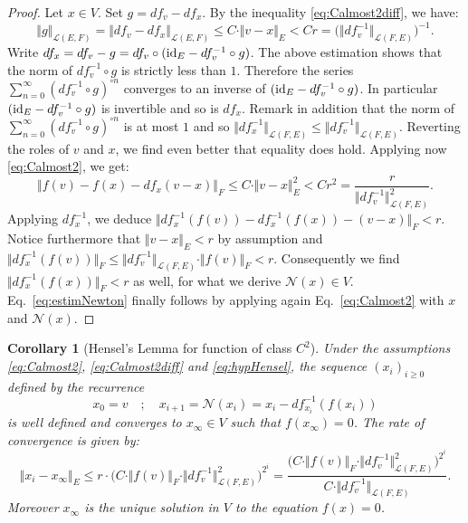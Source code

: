 \documentclass[11pt]{article}
\numberwithin{equation}{section}
\numberwithin{figure}{section}
\renewcommand{\leq}{\leqslant}
\renewcommand{\geq}{\geqslant}
\newtheorem{cor}[theo]{Corollary}
\theoremstyle{definition}
\newcommand{\calL}{\mathcal L}
\newcommand{\calN}{\mathcal N}
\newcommand{\id}{\text{\rm id}}
\begin{document}
\begin{proof}
Let $x \in V$. Set $g = df_v - df_x$.
By the inequality \eqref{eq:Calmost2diff}, we have:
$$\Vert g \Vert_{\calL(E,F)} = 
\Vert df_v - df_x \Vert_{\calL(E,F)} \leq C \cdot
\Vert v{-}x \Vert_E < C r = \big(\Vert df_v^{-1} \Vert_{\calL(F,E)}\big)^{-1}.$$
Write
$df_x = df_v - g = df_v \circ (\id_E - df_v^{-1} 
\circ g)$. The above estimation shows that the norm of $df_v^{-1} 
\circ g$ is strictly less than $1$. Therefore the series
$\sum_{n=0}^\infty (df_v^{-1} \circ g)^{\circ n}$ converges to
an inverse of $(\id_E - df_v^{-1} \circ g)$. In particular 
$(\id_E - df_v^{-1} \circ g)$ is invertible and so is $df_x$.
Remark in addition that the norm of $\sum_{n=0}^\infty (df_v^{-1} 
\circ g)^{\circ n}$ is at most $1$ and so
$\Vert df_x^{-1} \Vert_{\calL(F,E)} \leq \Vert df_v^{-1} \Vert_{\calL(F,E)}$.
Reverting the roles of $v$ and $x$, we find even better that equality 
does hold.
Applying now \eqref{eq:Calmost2}, we get:
$$\Vert f(v) - f(x) - df_x(v{-}x) \Vert_F 
  \leq C \cdot \Vert v{-}x \Vert_E^2
  < C r^2 = \frac r {\Vert df_v^{-1} \Vert_{\calL(F,E)}^2}.$$
Applying $df_x^{-1}$, we deduce $\Vert df_x^{-1}(f(v)) - df_x^{-1}(f(x)) 
- (v{-}x) \Vert_F < r$. Notice furthermore that $\Vert v{-}x\Vert_E <
r$ by assumption and $\Vert df_x^{-1}(f(v)) \Vert_F \leq \Vert df_v^{-1} 
\Vert_{\calL(F,E)} \cdot \Vert f(v) \Vert_F < r$.
Consequently we find $\Vert df_x^{-1}(f(x)) \Vert_F < r$ as well, for
what we derive $\calN(x) \in V$. Eq.~\eqref{eq:estimNewton} finally
follows by applying again Eq.~\eqref{eq:Calmost2} with $x$ and 
$\calN(x)$.
\end{proof}

\begin{cor}[Hensel's Lemma for function of class $C^2$]
\label{cor:HenselC2}
Under the assumptions \eqref{eq:Calmost2}, \eqref{eq:Calmost2diff}
and \eqref{eq:hypHensel}, the sequence $(x_i)_{i \geq 0}$ defined by 
the recurrence
$$x_0 = v \quad ; 
\quad x_{i+1} = \calN(x_i) = x_i - df_{x_i}^{-1}(f(x_i))$$
is well defined and converges to $x_\infty \in V$ such that
$f(x_\infty) = 0$.
The rate of convergence is given by:
$$\Vert x_i - x_\infty \Vert_E \leq 
r \cdot \Big(C \cdot \Vert f(v) \Vert_F \cdot \Vert df_v^{-1} \Vert_{\calL(F,E)}^2 \Big)^{2^i} =
\frac {\Big(C \cdot \Vert f(v) \Vert_F \cdot \Vert df_v^{-1} \Vert_{\calL(F,E)}^2 \Big)^{2^i}}
{C \cdot \Vert df_v^{-1} \Vert_{\calL(F,E)}}.$$
Moreover $x_\infty$ is the unique solution in $V$ to the equation $f(x) 
= 0$.
\end{cor}
\end{document}
